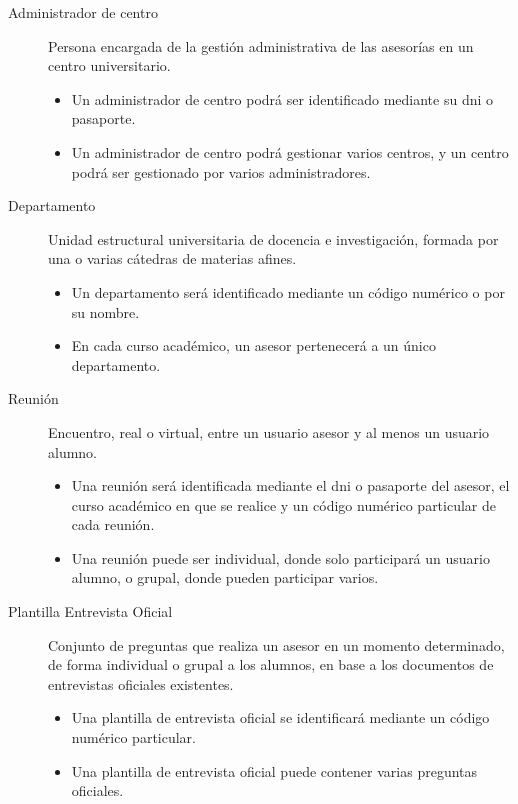 \begin{description}
      \item[Administrador de centro] Persona encargada de la gestión
      administrativa de las asesorías en un centro universitario.
      \begin{itemize}
       \item Un administrador de centro podrá ser identificado mediante su dni o
       pasaporte.
       \item Un administrador de centro podrá gestionar varios centros, y un
       centro podrá ser gestionado por varios administradores.
      \end{itemize}

      \item[Departamento] Unidad estructural universitaria de docencia e
      investigación, formada por una o varias cátedras de materias afines.
      \begin{itemize}
       \item Un departamento será identificado mediante un código numérico o por
       su nombre.
       \item En cada curso académico, un asesor pertenecerá a un único
       departamento.
      \end{itemize}

      \item[Reunión] Encuentro, real o virtual, entre un usuario asesor y al
      menos un usuario alumno.
      \begin{itemize}
       \item Una reunión será identificada mediante el dni o pasaporte del
       asesor, el curso académico en que se realice y un código numérico
       particular de cada reunión.
       \item Una reunión puede ser individual, donde solo participará un
       usuario alumno, o grupal, donde pueden participar varios.
      \end{itemize}

      \item[Plantilla Entrevista Oficial] Conjunto de preguntas que realiza un
      asesor en un momento determinado, de forma individual o grupal a los
      alumnos, en base a los documentos de entrevistas oficiales existentes.
      \begin{itemize}
       \item Una plantilla de entrevista oficial se identificará mediante un
       código numérico particular.
       \item Una plantilla de entrevista oficial puede contener varias preguntas
       oficiales.
      \end{itemize}


\end{description}
